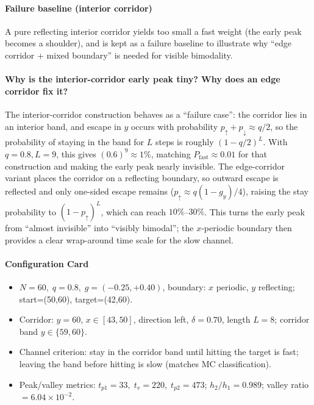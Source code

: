 \documentclass[11pt]{article}
\begin{document}
\paragraph{Failure baseline (interior corridor)} A pure reflecting interior corridor yields too small a fast weight (the early peak becomes a shoulder), and is kept as a failure baseline to illustrate why ``edge corridor + mixed boundary'' is needed for visible bimodality.

\paragraph{Why is the interior-corridor early peak tiny? Why does an edge corridor fix it?}
The interior-corridor construction behaves as a ``failure case'': the corridor lies in an interior band, and escape in $y$ occurs with probability $p_\uparrow+p_\downarrow\approx q/2$, so the probability of staying in the band for $L$ steps is roughly $(1-q/2)^L$. With $q=0.8,L=9$, this gives $(0.6)^9\approx 1\%$, matching $P_{\text{fast}}\approx 0.01$ for that construction and making the early peak nearly invisible. The edge-corridor variant places the corridor on a reflecting boundary, so outward escape is reflected and only one-sided escape remains ($p_\uparrow\approx q(1-g_y)/4$), raising the stay probability to $(1-p_\uparrow)^L$, which can reach $10\%$--$30\%$. This turns the early peak from ``almost invisible'' into ``visibly bimodal''; the $x$-periodic boundary then provides a clear wrap-around time scale for the slow channel.

\paragraph{Configuration Card}
\begin{itemize}
  \item $N=60,\;q=0.8,\;g=(-0.25,+0.40)$, boundary: $x$ periodic, $y$ reflecting; start=(50,60), target=(42,60).
  \item Corridor: $y=60$, $x\in[43,50]$, direction left, $\delta=0.70$, length $L=8$; corridor band $y\in\{59,60\}$.
  \item Channel criterion: stay in the corridor band until hitting the target is fast; leaving the band before hitting is slow (matches MC classification).
  \item Peak/valley metrics: $t_{p1}=33,\;t_v=220,\;t_{p2}=473$; $h_2/h_1=0.989$; valley ratio$=6.04\times 10^{-2}$.
\end{itemize}
\end{document}
